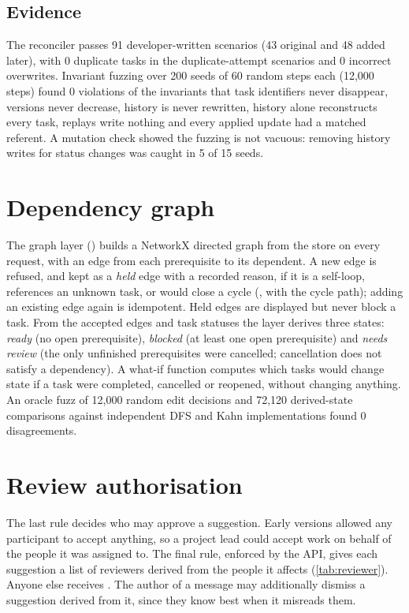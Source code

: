 \subsection{Evidence}
The reconciler passes 91 developer-written scenarios (43 original and 48 added later), with 0 duplicate tasks in the duplicate-attempt scenarios and 0 incorrect overwrites. Invariant fuzzing over 200 seeds of 60 random steps each (12,000 steps) found 0 violations of the invariants that task identifiers never disappear, versions never decrease, history is never rewritten, history alone reconstructs every task, replays write nothing and every applied update had a matched referent. A mutation check showed the fuzzing is not vacuous: removing history writes for status changes was caught in 5 of 15 seeds.

\section{Dependency graph}
The graph layer () builds a NetworkX directed graph from the store on every request, with an edge from each prerequisite to its dependent. A new edge is refused, and kept as a \emph{held} edge with a recorded reason, if it is a self-loop, references an unknown task, or would close a cycle (, with the cycle path); adding an existing edge again is idempotent. Held edges are displayed but never block a task. From the accepted edges and task statuses the layer derives three states: \emph{ready} (no open prerequisite), \emph{blocked} (at least one open prerequisite) and \emph{needs review} (the only unfinished prerequisites were cancelled; cancellation does not satisfy a dependency). A what-if function computes which tasks would change state if a task were completed, cancelled or reopened, without changing anything. An oracle fuzz of 12,000 random edit decisions and 72,120 derived-state comparisons against independent DFS and Kahn implementations \citep{kahn1962topological} found 0 disagreements.

\section{Review authorisation}
\label{sec:reviewer}
The last rule decides who may approve a suggestion. Early versions allowed any participant to accept anything, so a project lead could accept work on behalf of the people it was assigned to. The final rule, enforced by the API, gives each suggestion a list of reviewers derived from the people it affects (\cref{tab:reviewer}). Anyone else receives . The author of a message may additionally dismiss a suggestion derived from it, since they know best when it misreads them.

